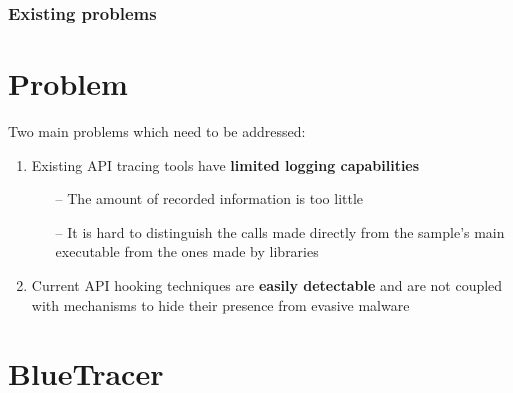 \documentclass[compress]{beamer}
\begin{document}
\begin{frame}
    \frametitle{Existing problems}

\section{Problem}	
Two main problems which need to be addressed:
\\\bigskip
\begin{enumerate}
\item Existing API tracing tools have \textbf{limited logging capabilities}
\smallskip
\begin{itemize}
\item[--] The amount of recorded information is too little
\item[--] It is hard to distinguish the calls made directly from the sample's main executable from the ones made by libraries
\end{itemize}
\bigskip
\item Current API hooking techniques are \textbf{easily detectable} and are not coupled with mechanisms to hide their presence
from evasive malware
\end{enumerate}

    
\end{frame}

\section{BlueTracer}
\end{document}
